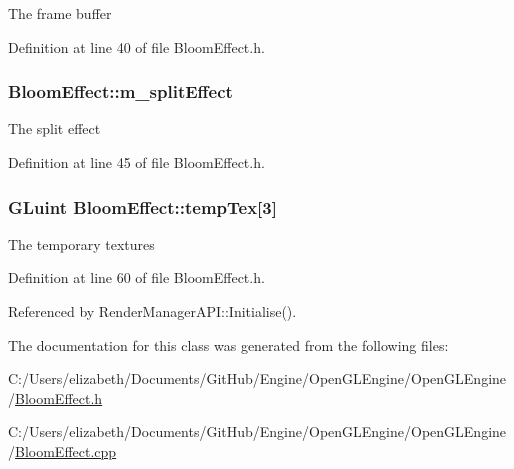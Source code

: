 The frame buffer 



Definition at line 40 of file Bloom\+Effect.\+h.

\subsubsection[{\texorpdfstring{m\+\_\+split\+Effect}{m_splitEffect}}]{ Bloom\+Effect\+::m\+\_\+split\+Effect\hspace{0.3cm}{\ttfamily [private]}}\hypertarget{class_bloom_effect_aabecb4a9b579674d07806b3676a26d52}{}\label{class_bloom_effect_aabecb4a9b579674d07806b3676a26d52}


The split effect 



Definition at line 45 of file Bloom\+Effect.\+h.

\subsubsection[{\texorpdfstring{temp\+Tex}{tempTex}}]{\setlength{\rightskip}{0pt plus 5cm}G\+Luint Bloom\+Effect\+::temp\+Tex\mbox{[}3\mbox{]}\hspace{0.3cm}{\ttfamily [private]}}\hypertarget{class_bloom_effect_a74ea9780de0ea8954b981dbaa61b3aa4}{}\label{class_bloom_effect_a74ea9780de0ea8954b981dbaa61b3aa4}


The temporary textures 



Definition at line 60 of file Bloom\+Effect.\+h.



Referenced by Render\+Manager\+A\+P\+I\+::\+Initialise().



The documentation for this class was generated from the following files\+:\begin{DoxyCompactItemize}
\item 
C\+:/\+Users/elizabeth/\+Documents/\+Git\+Hub/\+Engine/\+Open\+G\+L\+Engine/\+Open\+G\+L\+Engine/\hyperlink{_bloom_effect_8h}{Bloom\+Effect.\+h}\item 
C\+:/\+Users/elizabeth/\+Documents/\+Git\+Hub/\+Engine/\+Open\+G\+L\+Engine/\+Open\+G\+L\+Engine/\hyperlink{_bloom_effect_8cpp}{Bloom\+Effect.\+cpp}\end{DoxyCompactItemize}
